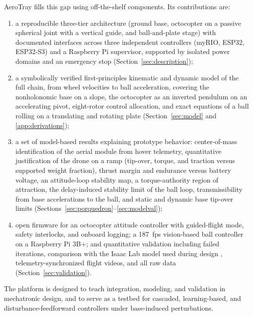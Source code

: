 AeroTray fills this gap using off-the-shelf components. Its contributions are:
\begin{enumerate}[label=(\roman*)]
  \item a reproducible three-tier architecture (ground base, octocopter on a passive spherical joint with a vertical guide, and ball-and-plate stage) with documented interfaces across three independent controllers (myRIO, ESP32, ESP32-S3) and a Raspberry Pi supervisor, supported by isolated power domains and an emergency stop (Section~\ref{sec:description});
  \item a symbolically verified first-principles kinematic and dynamic model of the full chain, from wheel velocities to ball acceleration, covering the nonholonomic base on a slope, the octocopter as an inverted pendulum on an accelerating pivot, eight-rotor control allocation, and exact equations of a ball rolling on a translating and rotating plate (Section~\ref{sec:model} and \ref{app:derivations});
  \item a set of model-based results explaining prototype behavior: center-of-mass identification of the aerial module from hover telemetry, quantitative justification of the drone on a ramp (tip-over, torque, and traction versus supported weight fraction), thrust margin and endurance versus battery voltage, an attitude-loop stability map, a torque-authority region of attraction, the delay-induced stability limit of the ball loop, transmissibility from base accelerations to the ball, and static and dynamic base tip-over limits (Sections~\ref{sec:porquedron}--\ref{sec:modelval});
  \item open firmware for an octocopter attitude controller with guided-flight mode, safety interlocks, and onboard logging; a \SI{187}{fps} vision-based ball controller on a Raspberry Pi 3B+; and quantitative validation including failed iterations, comparison with the Isaac Lab model used during design \cite{mittal2023,schulman2017}, telemetry-synchronized flight videos, and all raw data (Section~\ref{sec:validation}).
\end{enumerate}
The platform is designed to teach integration, modeling, and validation in mechatronic design, and to serve as a testbed for cascaded, learning-based, and disturbance-feedforward controllers under base-induced perturbations.
